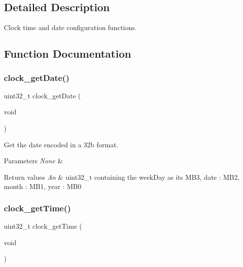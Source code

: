 \subsection{Detailed Description}
Clock time and date configuration functions. 



\subsection{Function Documentation}
\mbox{\label{group___clock___time___date_gabb4d72928cb3d131d40067fb141003aa}} 
\subsubsection{\texorpdfstring{clock\+\_\+get\+Date()}{clock\_getDate()}}
{\footnotesize\ttfamily uint32\+\_\+t clock\+\_\+get\+Date (\begin{DoxyParamCaption}\item[{void}]{ }\end{DoxyParamCaption})}



Get the date encoded in a 32b format. 


\begin{DoxyParams}{Parameters}
{\em None} & \\
\hline
\end{DoxyParams}

\begin{DoxyRetVals}{Return values}
{\em An} & uint32\+\_\+t containing the week\+Day as its M\+B3, date \+: M\+B2, month \+: M\+B1, year \+: M\+B0 \\
\hline
\end{DoxyRetVals}
\mbox{\label{group___clock___time___date_ga03ae6948083c259f6edc0b146f40dc62}} 
\subsubsection{\texorpdfstring{clock\+\_\+get\+Time()}{clock\_getTime()}}
{\footnotesize\ttfamily uint32\+\_\+t clock\+\_\+get\+Time (\begin{DoxyParamCaption}\item[{void}]{ }\end{DoxyParamCaption})}



